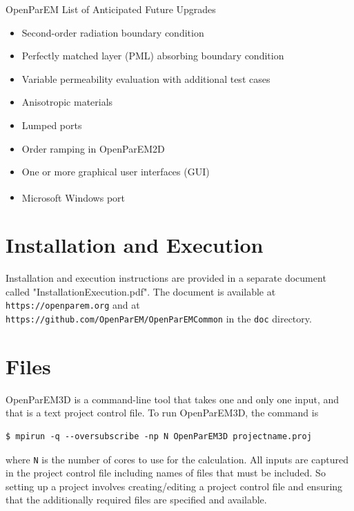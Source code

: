\documentclass[titlepage]{article}
\renewcommand\_{\textunderscore\linebreak[1]}
\begin{document}
\begin{table}[ht]
\caption{OpenParEM List of Anticipated Future Upgrades}
\noindent \hrulefill
\begin{itemize}[nosep]
   \item Second-order radiation boundary condition
   \item Perfectly matched layer (PML) absorbing boundary condition
   \item Variable permeability evaluation with additional test cases
   \item Anisotropic materials
   \item Lumped ports
   \item Order ramping in OpenParEM2D
   \item One or more graphical user interfaces (GUI)
   \item Microsoft Windows\textsuperscript{\textregistered} port
\end{itemize}
\noindent \hrulefill
\label{table:upgrades}
\end{table}

\section{Installation and Execution}

Installation and execution instructions are provided in a separate document called \newline"Installation\_Execution.pdf".  The document is available at \texttt{https://openparem.org} and at \newline\texttt{https://github.com/OpenParEM/OpenParEMCommon} in the \texttt{doc} directory. 

\section{Files}
\label{sec:files}

OpenParEM3D is a command-line tool that takes one and only one input, and that is a text project control file.  To run OpenParEM3D, the command is
\begin{Verbatim}[fontsize=\small]
   $ mpirun -q --oversubscribe -np N OpenParEM3D projectname.proj
\end{Verbatim}
where \verb+N+ is the number of cores to use for the calculation.  All inputs are captured in the project control file including names of files that must be included. So setting up a project involves creating/editing a project control file and ensuring that the additionally required files are specified and available.
\end{document}
